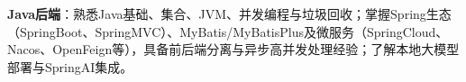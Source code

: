 \item \textbf{Java后端}：熟悉Java基础、集合、JVM、并发编程与垃圾回收；掌握Spring生态（SpringBoot、SpringMVC）、MyBatis/MyBatisPlus及微服务（SpringCloud、Nacos、OpenFeign等），具备前后端分离与异步高并发处理经验；了解本地大模型部署与SpringAI集成。